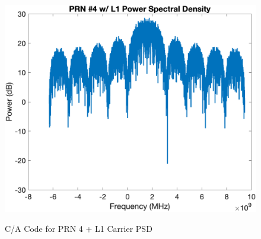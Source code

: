\documentclass{article}
\begin{document}
\begin{figure}[H]
    \centering
    \includegraphics[width=0.75\linewidth]{../figures/p9_prn4_psd.png}\label{p9_prn4_psd}
    \caption{C/A Code for PRN 4 + L1 Carrier PSD}
\end{figure}
\end{document}
